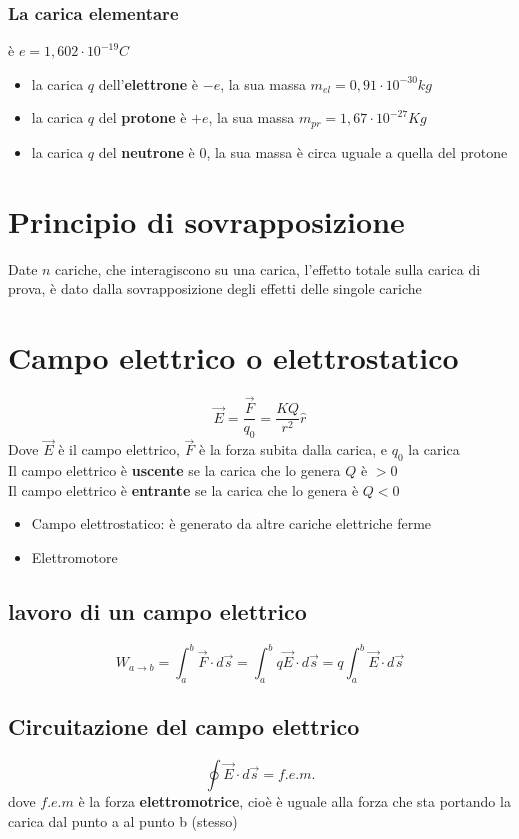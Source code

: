 \documentclass[a4paper]{report}
\begin{document}
  \subsubsection{La carica elementare}
  è $e = 1,602 \cdot 10^{-19} C$
  \begin{itemize}
    \item la carica $q$ dell'\textbf{elettrone} è $-e$, la sua massa $m_{el} = 0,91 \cdot 10^{-30} kg$
    \item la carica $q$ del \textbf{protone} è $+e$, la sua massa $m_{pr} = 1,67 \cdot 10^{-27} Kg$
    \item la carica $q$ del \textbf{neutrone} è $0$, la sua massa è circa uguale a quella del protone
  \end{itemize}

  \section{Principio di sovrapposizione}
  Date $n$ cariche, che interagiscono su una carica, l'effetto totale sulla carica di prova, è dato dalla sovrapposizione degli effetti delle singole cariche

  \section{Campo elettrico o elettrostatico}
  \[\vec{E} = \frac{\vec{F}}{q_0} = \frac{K Q}{r^2} \hat{r}\]
  Dove $\vec{E}$ è il campo elettrico, $\vec{F}$ è la forza subita dalla carica, e $q_0$ la carica\\
  Il campo elettrico è \textbf{uscente} se la carica che lo genera $Q$ è $>0$\\
  Il campo elettrico è \textbf{entrante} se la carica che lo genera è $Q<0$

  \begin{itemize}
    \item Campo elettrostatico: è generato da altre cariche elettriche ferme
    \item Elettromotore
  \end{itemize}

  \subsection{lavoro di un campo elettrico}
  \[ W_{a \rightarrow b} = \int_a^b \vec{F}\cdot d\vec{s} = \int_a^b q \vec{E} \cdot d\vec{s} = q \int_a^b \vec{E}\cdot d\vec{s} \]

  \subsection{Circuitazione del campo elettrico}
  \[\oint \vec{E} \cdot d\vec{s} = f.e.m.\]
  dove $f.e.m$ è la forza \textbf{elettromotrice}, cioè è uguale alla forza che sta portando la carica dal punto a al punto b (stesso)
\end{document}
